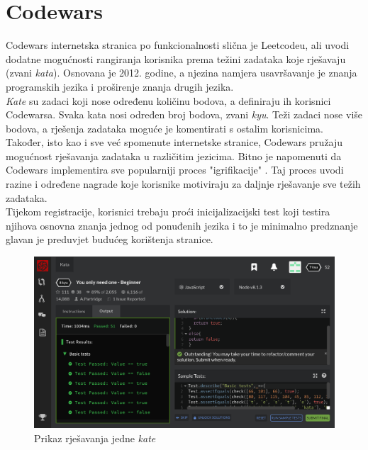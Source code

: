 \documentclass[times, utf8, zavrsni]{fer}
\begin{document}
		\section{Codewars}
		\label{sec:codewars}
		Codewars internetska stranica po funkcionalnosti slična je Leetcodeu, ali uvodi dodatne mogućnosti rangiranja korisnika prema težini zadataka koje rješavaju (zvani \textit{kata}). Osnovana je 2012. godine, a  njezina namjera usavršavanje je znanja programskih jezika i proširenje znanja drugih jezika.\\
		\textit{Kate} su zadaci koji nose određenu količinu bodova, a definiraju ih korisnici Codewarsa. Svaka kata nosi određen broj bodova, zvani \textit{kyu}. Teži zadaci nose više bodova, a rješenja zadataka moguće je komentirati s ostalim korisnicima. Također, isto kao i sve već spomenute internetske stranice, Codewars pružaju mogućnost rješavanja zadataka u različitim jezicima. Bitno je napomenuti da Codewars implementira sve popularniji proces "igrifikacije" . Taj proces uvodi razine i određene nagrade koje korisnike motiviraju za daljnje rješavanje sve težih zadataka.\\
		Tijekom registracije, korisnici trebaju proći inicijalizacijski test koji testira njihova osnovna znanja jednog od ponuđenih jezika i to je minimalno predznanje glavan je preduvjet budućeg korištenja stranice.
		\begin{figure}[H]
			\centering
			\includegraphics[width=\linewidth]{pictures/prikazi/Codewars.png}
			\caption{Prikaz rješavanja jedne \textit{kate}}
			\label{fig:codewars}
		\end{figure}
	
\end{document}
